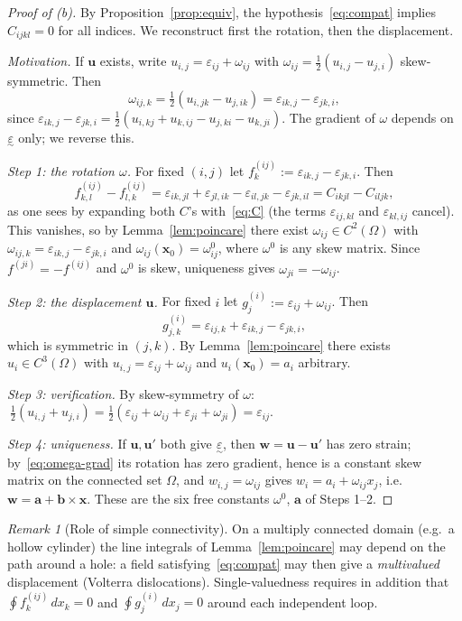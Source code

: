 \documentclass[11pt,a4paper]{article}
\theoremstyle{remark}
\newtheorem{remark}{Remark}
\newcommand{\eps}{\varepsilon}
\newcommand{\teps}{\underset{\sim}{\varepsilon}}
\begin{document}
\begin{proof}[Proof of (b)]
By Proposition~\ref{prop:equiv}, the hypothesis~\eqref{eq:compat} implies $C_{ijkl}=0$ for all indices. We reconstruct first the rotation, then the displacement.

\smallskip
\noindent\emph{Motivation.} If $\boldsymbol u$ exists, write $u_{i,j}=\eps_{ij}+\omega_{ij}$ with $\omega_{ij}=\frac12(u_{i,j}-u_{j,i})$ skew-symmetric. Then
\begin{equation}\label{eq:omega-grad}
  \omega_{ij,k}=\tfrac12\left(u_{i,jk}-u_{j,ik}\right)=\eps_{ik,j}-\eps_{jk,i},
\end{equation}
since $\eps_{ik,j}-\eps_{jk,i}=\frac12(u_{i,kj}+u_{k,ij}-u_{j,ki}-u_{k,ji})$. The gradient of $\omega$ depends on $\teps$ only; we reverse this.

\smallskip
\noindent\emph{Step 1: the rotation $\omega$.} For fixed $(i,j)$ let $f^{(ij)}_k:=\eps_{ik,j}-\eps_{jk,i}$. Then
\[
  f^{(ij)}_{k,l}-f^{(ij)}_{l,k}=\eps_{ik,jl}+\eps_{jl,ik}-\eps_{il,jk}-\eps_{jk,il}
  = C_{ikjl}-C_{iljk},
\]
as one sees by expanding both $C$'s with~\eqref{eq:C} (the terms $\eps_{ij,kl}$ and $\eps_{kl,ij}$ cancel). This vanishes, so by Lemma~\ref{lem:poincare} there exist $\omega_{ij}\in C^2(\Omega)$ with
$\omega_{ij,k}=\eps_{ik,j}-\eps_{jk,i}$ and $\omega_{ij}(\boldsymbol x_0)=\omega^0_{ij}$, where $\omega^0$ is any skew matrix. Since $f^{(ji)}=-f^{(ij)}$ and $\omega^0$ is skew, uniqueness gives $\omega_{ji}=-\omega_{ij}$.

\smallskip
\noindent\emph{Step 2: the displacement $\boldsymbol u$.} For fixed $i$ let $g^{(i)}_j:=\eps_{ij}+\omega_{ij}$. Then
\[
  g^{(i)}_{j,k}=\eps_{ij,k}+\eps_{ik,j}-\eps_{jk,i},
\]
which is symmetric in $(j,k)$. By Lemma~\ref{lem:poincare} there exists $u_i\in C^3(\Omega)$ with $u_{i,j}=\eps_{ij}+\omega_{ij}$ and $u_i(\boldsymbol x_0)=a_i$ arbitrary.

\smallskip
\noindent\emph{Step 3: verification.} By skew-symmetry of $\omega$:
$\ \tfrac12(u_{i,j}+u_{j,i})=\tfrac12(\eps_{ij}+\omega_{ij}+\eps_{ji}+\omega_{ji})=\eps_{ij}.$

\smallskip
\noindent\emph{Step 4: uniqueness.} If $\boldsymbol u,\boldsymbol u'$ both give $\teps$, then $\boldsymbol w=\boldsymbol u-\boldsymbol u'$ has zero strain; by~\eqref{eq:omega-grad} its rotation has zero gradient, hence is a constant skew matrix on the connected set $\Omega$, and $w_{i,j}=\omega_{ij}$ gives $w_i=a_i+\omega_{ij}x_j$, i.e.\ $\boldsymbol w=\boldsymbol a+\boldsymbol b\times\boldsymbol x$. These are the six free constants $\omega^0$, $\boldsymbol a$ of Steps 1--2.
\end{proof}

\begin{remark}[Role of simple connectivity]
On a multiply connected domain (e.g.\ a hollow cylinder) the line integrals of Lemma~\ref{lem:poincare} may depend on the path around a hole: a field satisfying~\eqref{eq:compat} may then give a \emph{multivalued} displacement (Volterra dislocations). Single-valuedness requires in addition that $\oint f^{(ij)}_k\,dx_k=0$ and $\oint g^{(i)}_j\,dx_j=0$ around each independent loop.
\end{remark}
\end{document}
